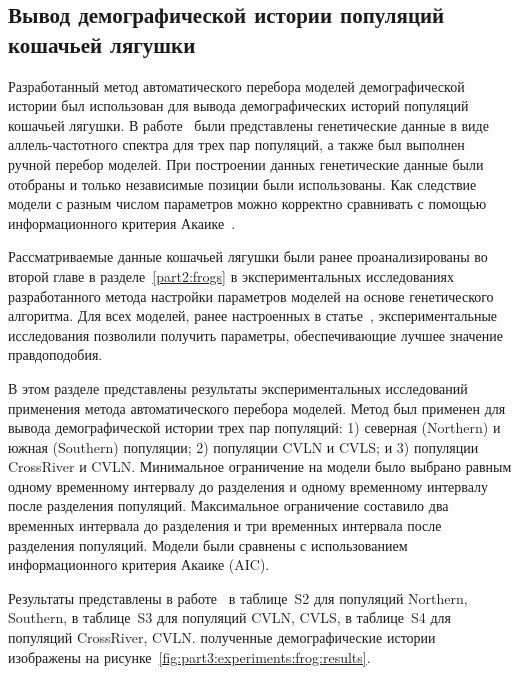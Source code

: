 \subsection{Вывод демографической истории популяций кошачьей лягушки}

Разработанный метод автоматического перебора моделей демографической истории был использован для вывода демографических историй популяций кошачьей лягушки.
В работе~\cite{portik2017evaluating} были представлены генетические данные в виде аллель-частотного спектра для трех пар популяций, а также был выполнен ручной перебор моделей.
При построении данных генетические данные были отобраны и только независимые позиции были использованы.
Как следствие модели с разным числом параметров можно корректно сравнивать с помощью информационного критерия Акаике~\cite{akaike1974new}.

Рассматриваемые данные кошачьей лягушки были ранее проанализированы во второй главе в разделе~\ref{part2:frogs} в экспериментальных исследованиях разработанного метода настройки параметров моделей на основе генетического алгоритма.
Для всех моделей, ранее настроенных в статье~\cite{portik2017evaluating}, экспериментальные исследования позволили получить параметры, обеспечивающие лучшее значение правдоподобия.

В этом разделе представлены результаты экспериментальных исследований применения метода автоматического перебора моделей.
Метод был применен для вывода демографической истории трех пар популяций: 1) северная (Northern) и южная (Southern) популяции; 2) популяции CVLN и CVLS; и 3) популяции CrossRiver и CVLN.
Минимальное ограничение на модели было выбрано равным одному временному интервалу до разделения и одному временному интервалу после разделения популяций.
Максимальное ограничение составило два временных интервала до разделения и три временных интервала после разделения популяций.
Модели были сравнены с использованием информационного критерия Акаике (AIC).

Результаты представлены в работе~\cite{noskova2020gadma} в таблице~S2 для популяций Northern, Southern, в таблице~S3 для популяций CVLN, CVLS, в таблице~S4 для популяций CrossRiver, CVLN.
полученные демографические истории изображены на рисунке~\ref{fig:part3:experiments:frog:results}.

